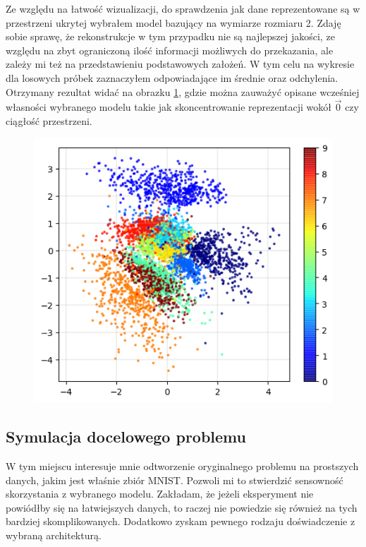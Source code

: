 Ze względu na łatwość wizualizacji, do sprawdzenia jak dane reprezentowane są w przestrzeni ukrytej wybrałem model bazujący na wymiarze rozmiaru 2. Zdaję sobie sprawę, że rekonstrukcje w tym przypadku nie są najlepszej jakości, ze względu na zbyt ograniczoną ilość informacji możliwych do przekazania, ale zależy mi też na przedstawieniu podstawowych założeń. W tym celu na wykresie dla losowych próbek zaznaczyłem odpowiadające im średnie oraz odchylenia. Otrzymany rezultat widać na obrazku \ref{fig:mnist_2d}, gdzie można zauważyć opisane wcześniej własności wybranego modelu takie jak skoncentrowanie reprezentacji wokół $\vec{0}$ czy ciągłość przestrzeni.

\begin{figure}[h!]
    \centering
    \includegraphics[width=1.\textwidth]{images/mnist_2d}
    \caption{}
    \label{fig:mnist_2d}
\end{figure}

\subsection{Symulacja docelowego problemu}

W tym miejscu interesuje mnie odtworzenie oryginalnego problemu na prostszych danych, jakim jest właśnie zbiór MNIST. Pozwoli mi to stwierdzić sensowność skorzystania z wybranego modelu. Zakładam, że jeżeli eksperyment nie powiódłby się na łatwiejszych danych, to raczej nie powiedzie się również na tych bardziej skomplikowanych. Dodatkowo zyskam pewnego rodzaju doświadczenie z wybraną architekturą.




